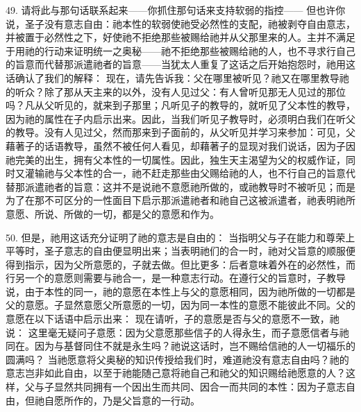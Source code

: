 49. 请将此与那句话联系起来——你抓住那句话来支持软弱的指控—— 但也许你说，圣子没有意志自由：祂本性的软弱使祂受必然性的支配，祂被剥夺自由意志，并被置于必然性之下，好使祂不拒绝那些被赐给祂并从父那里来的人。主并不满足于用祂的行动来证明统一之奥秘——祂不拒绝那些被赐给祂的人，也不寻求行自己的旨意而代替那派遣祂者的旨意——当犹太人重复了这话之后开始抱怨时，祂用这话确认了我们的解释： 现在，请先告诉我：父在哪里被听见？祂又在哪里教导祂的听众？除了那从天主来的以外，没有人见过父：有人曾听见那无人见过的那位吗？凡从父听见的，就来到子那里；凡听见子的教导的，就听见了父本性的教导，因为祂的属性在子内启示出来。因此，当我们听见子教导时，必须明白我们在听父的教导。没有人见过父，然而那来到子面前的，从父听见并学习来参加：可见，父藉著子的话语教导，虽然不被任何人看见，却藉著子的显现对我们说话，因为子因祂完美的出生，拥有父本性的一切属性。因此，独生天主渴望为父的权威作证，同时又灌输祂与父本性的合一，祂不赶走那些由父赐给祂的人，也不行自己的旨意代替那派遣祂者的旨意：这并不是说祂不意愿祂所做的，或祂教导时不被听见；而是为了在那不可区分的一性面目下启示那派遣祂者和祂自己这被派遣者，祂表明祂所意愿、所说、所做的一切，都是父的意愿和作为。\par

50. 但是，祂用这话充分证明了祂的意志是自由的： 当指明父与子在能力和尊荣上平等时，圣子意志的自由便显明出来；当表明祂们的合一时，祂对父旨意的顺服便得到指示，因为父所意愿的，子就去做。但比更多：后者意味着外在的必然性，而行另一个的意愿则需要与祂合一，是一种意志行动。在遵行父的旨意时，子教导说，由于本性的同一，祂的意愿在本性上与父的意愿相同，因为祂所做的一切都是父的意愿。子显然意愿父所意愿的一切，因为同一本性的意愿不能彼此不同。父的意愿在以下话语中启示出来： 现在请听，子的意愿是否与父的意愿不一致，祂说： 这里毫无疑问子意愿：因为父意愿那些信子的人得永生，而子意愿信者与祂同在。因为与基督同住不就是永生吗？祂说这话时，岂不赐给信祂的人一切福乐的圆满吗？ 当祂愿意将父奥秘的知识传授给我们时，难道祂没有意志自由吗？祂的意志岂非如此自由，以至于祂能随己意将祂自己和祂父的知识赐给祂愿意的人？这样，父与子显然共同拥有一个因出生而共同、因合一而共同的本性：因为子意志自由，但祂自愿所作的，乃是父旨意的一行动。\par

